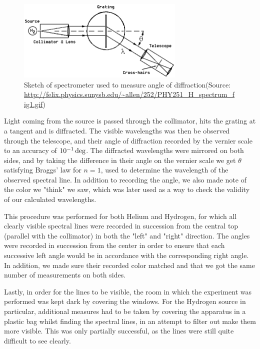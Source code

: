 \documentclass[11pt,a4paper]{article}
\begin{document}
    \begin{figure}[H]
        \center
        \includegraphics[width=8cm]{scripts/figs/PHY251_H_spectrum_fig1.png}
        \caption{Sketch of spectrometer used to measure angle of diffraction(Source: \url{http://felix.physics.sunysb.edu/~allen/252/PHY251_H_spectrum_fig1.gif})}
        \label{fig:spectrometer}
    \end{figure}

    Light coming from the source is passed through the collimator, hits the grating at a tangent and is diffracted. The visible wavelengths was then be observed through the telescope, and their angle of diffraction recorded by the vernier scale to an accuracy of $10^{-1}\,\textup{deg}$. The diffracted wavelengths were mirrored on both sides, and by taking the difference in their angle on the vernier scale we get $\theta$ satisfying Braggs' law for $n=1$, used to determine the wavelength of the observed spectral line. In addition to recording the angle, we also made note of the color we "think" we saw, which was later used as a way to check the validity of our calculated wavelengths.

    This procedure was performed for both Helium and Hydrogen, for which all clearly visible spectral lines were recorded in succession from the central top (parallel with the collimator) in both the "left" and "right" direction. The angles were recorded in succession from the center in order to ensure that each successive left angle would be in accordance with the corresponding right angle. In addition, we made sure their recorded color matched and that we got the same number of measurements on both sides.

    Lastly, in order for the lines to be visible, the room in which the experiment was performed was kept dark by covering the windows. For the Hydrogen source in particular, additional measures had to be taken by covering the apparatus in a plastic bag whilst finding the spectral lines, in an attempt to filter out make them more visible. This was only partially successful, as the lines were still quite difficult to see clearly.
\end{document}
